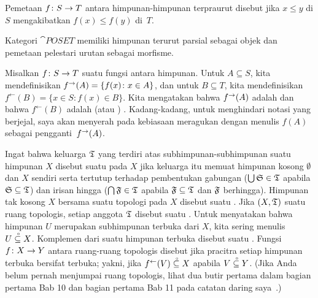 \begin{defn} Pemetaan $f\colon S \rightarrow T$ antara himpunan-himpunan terpraurut disebut
 jika $x \le y$ di $S$ mengakibatkan $f(x) \le f(y)$ di~$T$.
\end{defn}

\begin{exam} Kategori
$\cat{POSET}$ memiliki himpunan terurut parsial sebagai objek dan pemetaan pelestari urutan sebagai morfisme.
\end{exam}

\begin{notn} Misalkan $f \colon S \rightarrow T$ suatu fungsi antara himpunan. Untuk $A \subseteq S$, kita mendefinisikan
$f^{\rightarrow}(A) = \{f(x)\colon x \in A\}$, dan untuk $B \subseteq T$, kita mendefinisikan
$f^{\gets}(B) = \{ x \in S\colon f(x) \in B\}$. Kita mengatakan bahwa $f^{\rightarrow}(A)$ adalah
 dan bahwa $f^{\gets}(B)$ adalah
 (atau
) . Kadang-kadang, untuk menghindari notasi yang berjejal, saya akan menyerah pada kebiasaan meragukan dengan
menulis $f(A)$ sebagai pengganti~$f^{\rightarrow}(A)$.
\end{notn}

\begin{defn} Ingat bahwa keluarga $\mathfrak{T}$ yang terdiri atas subhimpunan-subhimpunan suatu himpunan $X$ disebut suatu
 pada $X$ jika keluarga itu memuat himpunan kosong $\emptyset$ dan $X$ sendiri serta tertutup terhadap pembentukan gabungan
($\bigcup\mathfrak{S} \in \mathfrak{T}$ apabila $\mathfrak{S} \subseteq \mathfrak{T}$) dan irisan hingga ($\bigcap\mathfrak{F} \in \mathfrak{T}$
apabila $\mathfrak{F} \subseteq \mathfrak{T}$ dan $\mathfrak{F}$ berhingga). Himpunan tak kosong $X$ bersama suatu topologi pada $X$ disebut suatu
. Jika $(X,\mathfrak{T})$ suatu ruang topologis, setiap anggota $\mathfrak{T}$ disebut suatu
. Untuk menyatakan bahwa himpunan $U$ merupakan subhimpunan terbuka dari $X$, kita sering menulis $U\overset{\thickspace{}_\circ}{\subseteq}X$. Komplemen dari suatu himpunan terbuka disebut suatu
. Fungsi $f\colon X \rightarrow Y$ antara ruang-ruang topologis disebut
 jika pracitra setiap himpunan terbuka bersifat terbuka; yakni, jika $f^{\gets}(V)\overset{\thickspace{}_\circ}{\subseteq}X$ apabila $V\overset{\thickspace{}_\circ}{\subseteq}Y$.
(Jika Anda belum pernah menjumpai ruang topologis, lihat dua butir pertama dalam bagian pertama
Bab 10 dan bagian pertama Bab 11 pada catatan daring saya~\cite{Erdman:2007}.)
\end{defn}

